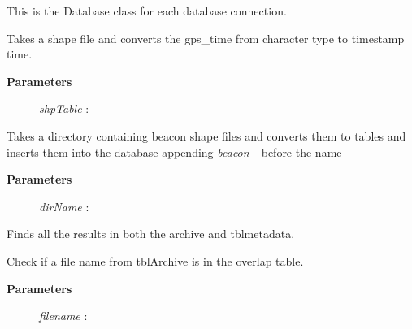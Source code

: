 \documentclass[letterpaper,10pt,english]{sphinxmanual}
\begin{document}
\begin{fulllineitems}
\label{code:Database.Database}
This is the Database class for each database connection.

\begin{fulllineitems}
\label{code:Database.Database.alterTimestamp}
Takes a shape file and converts the gps\_time from character type to timestamp time.
\begin{description}
\item[{\textbf{Parameters}}] \leavevmode
\emph{shpTable}  :

\end{description}

\end{fulllineitems}


\begin{fulllineitems}
\label{code:Database.Database.beaconShapefilesToTables}
Takes a directory containing beacon shape files and converts them to tables and 
inserts them into the database appending \emph{beacon\_} before the name
\begin{description}
\item[{\textbf{Parameters}}] \leavevmode
\emph{dirName}   :

\end{description}

\end{fulllineitems}


\begin{fulllineitems}
\label{code:Database.Database.bothArchiveandMetadata}
Finds all the results in both the archive and tblmetadata.

\end{fulllineitems}


\begin{fulllineitems}
\label{code:Database.Database.checkTblArchiveOverLapsTblMetadata}
Check if a file name from tblArchive is in the overlap table.
\begin{description}
\item[{\textbf{Parameters}}] \leavevmode
\emph{filename}  :


\end{description}
\end{fulllineitems}
\end{fulllineitems}
\end{document}
